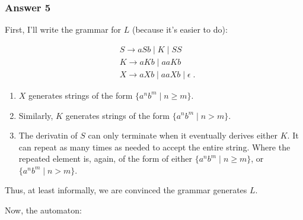 \documentclass[11pt]{article}
\begin{document}
\subsubsection{Answer 5}
\label{sec-1-3-1}
First, I'll write the grammar for $L$ (because it's easier to do):

\begin{align*}
  &S \to aSb \;|\; K \;|\; SS \\
  &K \to aKb \;|\; aaKb \\
  &X \to aXb \;|\; aaXb \;|\; \epsilon \;.
\end{align*}

\begin{enumerate}
\item $X$ generates strings of the form $\{ a^nb^m \;|\; n \geq m \}$.
\item Similarly, $K$ generates strings of the form $\{ a^nb^m \;|\; n > m \}$.
\item The derivatin of $S$ can only terminate when it eventually derives either
$K$.  It can repeat as many times as needed to accept the entire string.
Where the repeated element is, again, of the form of either $\{ a^nb^m
        \;|\; n \geq m \}$, or  $\{ a^nb^m \;|\; n > m \}$.
\end{enumerate}

Thus, at least informally, we are convinced the grammar generates $L$.

Now, the automaton:
\end{document}
